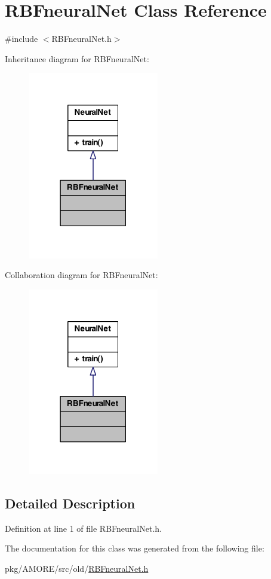 \hypertarget{class_r_b_fneural_net}{
\section{RBFneuralNet Class Reference}
\label{class_r_b_fneural_net}
}


{\ttfamily \#include $<$RBFneuralNet.h$>$}



Inheritance diagram for RBFneuralNet:\nopagebreak
\begin{figure}[H]
\begin{center}
\leavevmode
\includegraphics[width=162pt]{class_r_b_fneural_net__inherit__graph}
\end{center}
\end{figure}


Collaboration diagram for RBFneuralNet:\nopagebreak
\begin{figure}[H]
\begin{center}
\leavevmode
\includegraphics[width=162pt]{class_r_b_fneural_net__coll__graph}
\end{center}
\end{figure}


\subsection{Detailed Description}


Definition at line 1 of file RBFneuralNet.h.



The documentation for this class was generated from the following file:\begin{DoxyCompactItemize}
\item 
pkg/AMORE/src/old/\hyperlink{_r_b_fneural_net_8h}{RBFneuralNet.h}\end{DoxyCompactItemize}
